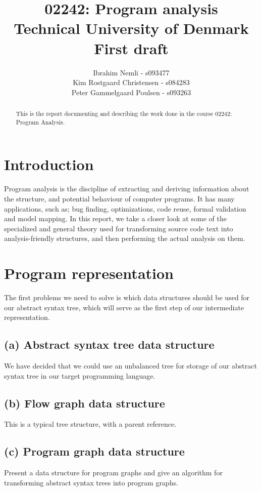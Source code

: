 \documentclass[12pt]{article}
\title{02242: Program analysis \\ 
		\medskip \large{Technical University of Denmark} \\ \medskip  \large{First draft}}
\author{Ibrahim Nemli - s093477 \\
        Kim Rostgaard Christensen - s084283\\
        Peter Gammelgaard Poulsen - s093263}
\begin{document}
\maketitle
 
\begin{abstract}
This is the report documenting and describing the work done in the course 02242: Program Analysis.
\end{abstract}

\section{Introduction}
Program analysis is the discipline of extracting and deriving information about the structure, and potential behaviour of computer programs. It has many applications, such as; bug finding, optimizations, code reuse, formal validation and model mapping. In this report, we take a closer look at some of the specialized and general theory used for transforming source code text into analysis-friendly structures, and then performing the actual analysis on them.

\section{Program representation}
The first problems we need to solve is which data structures should be used for our abstract syntax tree, which will serve as the first step of our intermediate representation.
\subsection*{(a) Abstract syntax tree data structure}
We have decided that we could use an unbalanced tree for storage of our abstract syntax tree in our target programming language.
\subsection*{(b) Flow graph data structure}
This is a typical tree structure, with a parent reference.
\subsection*{(c) Program graph data structure}
Present a data structure for program graphs and give an algorithm for
transforming abstract syntax trees into program graphs.
\end{document}
